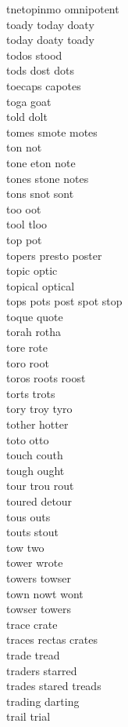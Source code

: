 tnetopinmo omnipotent\\
toady today doaty\\
today doaty toady\\
todos stood\\
tods dost dots\\
toecaps capotes\\
toga goat\\
told dolt\\
tomes smote motes\\
ton not\\
tone eton note\\
tones stone notes\\
tons snot sont\\
too oot\\
tool tloo\\
top pot\\
topers presto poster\\
topic optic\\
topical optical\\
tops pots post spot stop\\
toque quote\\
torah rotha\\
tore rote\\
toro root\\
toros roots roost\\
torts trots\\
tory troy tyro\\
tother hotter\\
toto otto\\
touch couth\\
tough ought\\
tour trou rout\\
toured detour\\
tous outs\\
touts stout\\
tow two\\
tower wrote\\
towers towser\\
town nowt wont\\
towser towers\\
trace crate\\
traces rectas crates\\
trade tread\\
traders starred\\
trades stared treads\\
trading darting\\
trail trial\\
